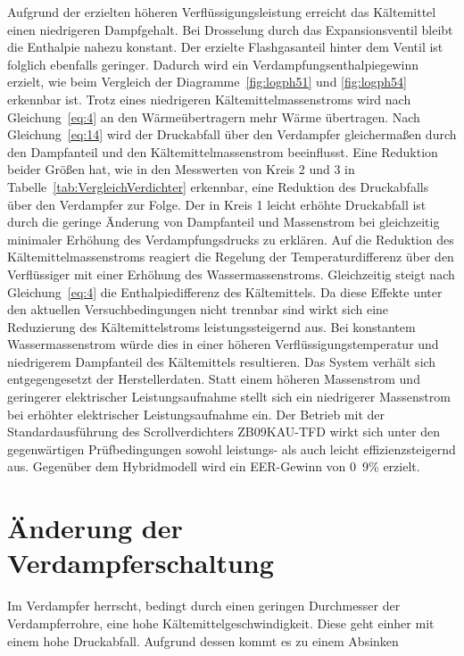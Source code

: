 Aufgrund der erzielten höheren Verflüssigungsleistung erreicht das Kältemittel einen niedrigeren Dampfgehalt. Bei Drosselung durch das Expansionsventil bleibt die Enthalpie nahezu konstant. Der erzielte Flashgasanteil hinter dem Ventil ist folglich ebenfalls geringer. Dadurch wird ein Verdampfungsenthalpiegewinn erzielt, wie beim Vergleich der Diagramme~\ref{fig:logph51} und \ref{fig:logph54} erkennbar ist. Trotz eines niedrigeren Kältemittelmassenstroms wird nach Gleichung~\ref{eq:4} an den Wärmeübertragern mehr Wärme übertragen. Nach Gleichung~\ref{eq:14} wird der Druckabfall über den Verdampfer gleichermaßen durch den Dampfanteil und den Kältemittelmassenstrom beeinflusst. Eine Reduktion beider Größen hat, wie in den Messwerten von Kreis 2 und 3 in Tabelle~\ref{tab:VergleichVerdichter} erkennbar, eine Reduktion des Druckabfalls über den Verdampfer zur Folge. Der in Kreis 1 leicht erhöhte Druckabfall ist durch die geringe Änderung von Dampfanteil und Massenstrom bei gleichzeitig minimaler Erhöhung des Verdampfungsdrucks zu erklären.
Auf die Reduktion des Kältemittelmassenstroms reagiert die Regelung der Temperaturdifferenz über den Verflüssiger mit einer Erhöhung des Wassermassenstroms.
Gleichzeitig steigt nach Gleichung~\ref{eq:4} die Enthalpiedifferenz des Kältemittels.
Da diese Effekte unter den aktuellen Versuchbedingungen nicht trennbar sind wirkt sich eine Reduzierung des Kältemittelstroms leistungssteigernd aus.
Bei konstantem Wassermassenstrom würde dies in einer höheren Verflüssigungstemperatur und niedrigerem Dampfanteil des Kältemittels resultieren.
Das System verhält sich entgegengesetzt der Herstellerdaten. Statt einem höheren Massenstrom und geringerer elektrischer Leistungsaufnahme stellt sich ein niedrigerer Massenstrom bei erhöhter elektrischer Leistungsaufnahme ein.
Der Betrieb mit der Standardausführung des Scrollverdichters ZB09KAU-TFD wirkt sich unter den gegenwärtigen Prüfbedingungen sowohl leistungs- als auch leicht effizienzsteigernd aus. Gegenüber dem Hybridmodell wird ein EER-Gewinn von \unit{0.9}{\%} erzielt.


\section{Änderung der Verdampferschaltung}
\label{sec:Änderung der Verdampferschaltung}




Im Verdampfer herrscht, bedingt durch einen geringen Durchmesser der Verdampferrohre, eine hohe Kältemittelgeschwindigkeit. Diese geht einher mit einem hohe Druckabfall. Aufgrund dessen kommt es zu einem Absinken


